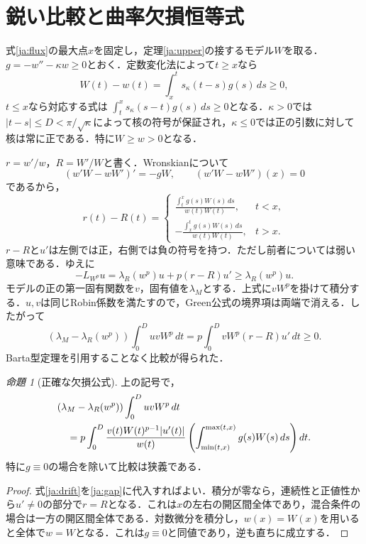 \documentclass[12pt]{amsart}
\theoremstyle{definition}
\theoremstyle{remark}
\numberwithin{equation}{section}
\newtheorem{jprop}[thm]{命題}
\begin{document}
\section{鋭い比較と曲率欠損恒等式}
式\eqref{ja:flux}の最大点$x$を固定し，定理\ref{ja:upper}の接するモデル$W$を取る．$g=-w''-\kappa w\ge0$とおく．定数変化法によって$t\ge x$なら
\[
 W(t)-w(t)=\int_x^t s_\kappa(t-s)g(s)\,ds\ge0,
\]
$t\le x$なら対応する式は
$\int_t^x s_\kappa(s-t)g(s)\,ds\ge0$となる．$\kappa>0$では
$|t-s|\le D<\pi/\sqrt\kappa$によって核の符号が保証され，$\kappa\le0$では正の引数に対して核は常に正である．特に$W\ge w>0$となる．

$r=w'/w$，$R=W'/W$と書く．Wronskianについて
\[
 (w'W-wW')'=-gW,\qquad (w'W-wW')(x)=0
\]
であるから，
\begin{equation}\label{ja:drift}
 r(t)-R(t)=
 \begin{cases}
 \displaystyle\frac{\int_t^x g(s)W(s)\,ds}{w(t)W(t)},&t<x,\\[6pt]
 \displaystyle-\frac{\int_x^t g(s)W(s)\,ds}{w(t)W(t)},&t>x.
 \end{cases}
\end{equation}
$r-R$と$u'$は左側では正，右側では負の符号を持つ．ただし前者については弱い意味である．ゆえに
\[
 -L_{W^p}u=\lambda_R(w^p)u+p(r-R)u'\ge\lambda_R(w^p)u.
\]
モデルの正の第一固有関数を$v$，固有値を$\lambda_M$とする．上式に$vW^p$を掛けて積分する．$u,v$は同じRobin係数を満たすので，Green公式の境界項は両端で消える．したがって
\begin{equation}\label{ja:gap}
 (\lambda_M-\lambda_R(w^p))\int_0^D uvW^p\,dt
 =p\int_0^D vW^p(r-R)u'\,dt\ge0.
\end{equation}
Barta型定理を引用することなく比較が得られた．

\begin{jprop}[正確な欠損公式]\label{ja:defect}
上の記号で，
\begin{align}\label{ja:defectidentity}
 &(\lambda_M-\lambda_R(w^p))\int_0^DuvW^p\,dt\\
 &\quad=p\int_0^D\frac{v(t)W(t)^{p-1}|u'(t)|}{w(t)}
 \left(\int_{\min(t,x)}^{\max(t,x)}g(s)W(s)\,ds\right)dt.\notag
\end{align}
特に$g\equiv0$の場合を除いて比較は狭義である．
\end{jprop}
\begin{proof}
式\eqref{ja:drift}を\eqref{ja:gap}に代入すればよい．積分が零なら，連続性と正値性から$u'\ne0$の部分で$r=R$となる．これは$x$の左右の開区間全体であり，混合条件の場合は一方の開区間全体である．対数微分を積分し，$w(x)=W(x)$を用いると全体で$w=W$となる．これは$g\equiv0$と同値であり，逆も直ちに成立する．
\end{proof}
\end{document}
